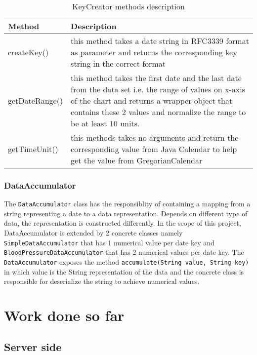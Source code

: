 \begin{table}[h]
\begin{center}
    \begin{tabular}{| l | p{12cm} |}
        \hline Method & Description \\
        \hline createKey() & 
            this method takes a date string in RFC3339 format as parameter and returns the corresponding key string in
            the correct format \\
        \hline getDateRange() &
            this method takes the first date and the last date from the data set i.e. the range of values on x-axis of
            the chart and returns a wrapper object that contains these 2 values and normalize the range to be at least
            10 units. \\
        \hline getTimeUnit() &
            this methods takes no arguments and return the corresponding value from Java Calendar to help get the value
            from GregorianCalendar \\
        \hline
    \end{tabular}
    \caption{KeyCreator methods description}
\end{center}
\end{table}

\subsubsection{DataAccumulator}
The \texttt{DataAccumulator} class has the responsiblity of containing a mapping from a string representing a date to a
data representation. Depends on different type of data, the representation is constructed differently. In the scope of
this project, DataAccumulator is extended by 2 concrete classes namely \texttt{SimpleDataAccumulator} that has 1
numerical value per date key and \texttt{BloodPressureDataAccumulator} that has 2 numerical values per date key. The
\texttt{DataAccumulator} exposes the method \texttt{accumulate(String value, String key)} in which value is the String
representation of the data and the concrete class is responsible for deserialize the string to achieve numerical values.

\section{Work done so far}
\label{sec:Work done so far}
\subsection{Server side}

